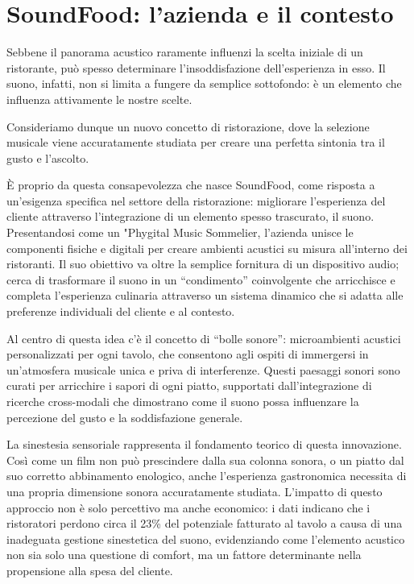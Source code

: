 
%

\chapter{SoundFood: {l'azienda e il contesto}}


Sebbene il panorama acustico raramente influenzi la scelta iniziale di un ristorante, può spesso determinare l'insoddisfazione dell'esperienza in esso. Il suono, infatti, non si limita a fungere da semplice sottofondo: è un elemento che influenza attivamente le nostre scelte.

Consideriamo dunque un nuovo concetto di ristorazione, dove la selezione musicale viene accuratamente studiata per creare una perfetta sintonia tra il gusto e l'ascolto.

È proprio da questa consapevolezza che nasce SoundFood, come risposta a un'esigenza specifica nel settore della ristorazione: migliorare l'esperienza del cliente attraverso l'integrazione di un elemento  spesso trascurato, il suono. Presentandosi come un "Phygital Music Sommelier, l'azienda unisce le componenti fisiche e digitali per creare ambienti acustici su misura all'interno dei ristoranti. Il suo obiettivo va oltre la semplice fornitura di un dispositivo audio; cerca di trasformare il suono in un “condimento” coinvolgente che arricchisce e completa l'esperienza culinaria attraverso un sistema  dinamico che si adatta alle preferenze individuali del cliente e al contesto. \cite{soundfood2016}

Al centro di questa idea c’è il concetto di “bolle sonore”: microambienti acustici personalizzati per ogni tavolo, che consentono agli ospiti di immergersi in un'atmosfera musicale unica e priva di interferenze. Questi paesaggi sonori sono curati per arricchire i sapori di ogni piatto, supportati dall’integrazione di ricerche cross-modali che dimostrano come il suono possa influenzare la percezione del gusto e la soddisfazione generale.

La sinestesia sensoriale rappresenta il fondamento teorico di questa innovazione. Così come un film non può prescindere dalla sua colonna sonora, o un piatto dal suo corretto abbinamento enologico, anche l'esperienza gastronomica necessita di una propria dimensione sonora accuratamente studiata. L'impatto di questo approccio non è solo percettivo ma anche economico: i dati indicano che i ristoratori perdono circa il 23\% del potenziale fatturato al tavolo a causa di una inadeguata gestione sinestetica del suono, evidenziando come l'elemento acustico non sia solo una questione di comfort, ma un fattore determinante nella propensione alla spesa del cliente. \cite{negreira2019acoustics}

